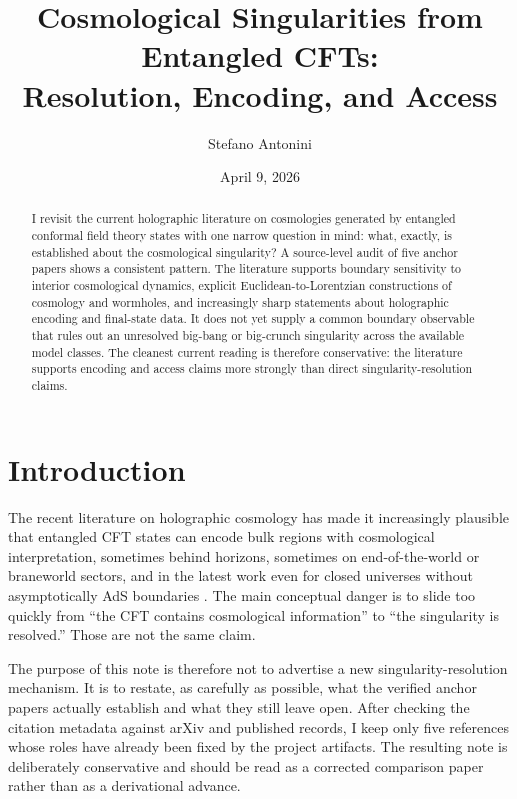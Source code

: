 \documentclass[11pt]{article}
\title{Cosmological Singularities from Entangled CFTs:\\
Resolution, Encoding, and Access}
\author{Stefano Antonini}
\date{April 9, 2026}
\begin{document}
\maketitle

\begin{abstract}
I revisit the current holographic literature on cosmologies generated by entangled conformal field theory states with one narrow question in mind: what, exactly, is established about the cosmological singularity? A source-level audit of five anchor papers shows a consistent pattern. The literature supports boundary sensitivity to interior cosmological dynamics, explicit Euclidean-to-Lorentzian constructions of cosmology and wormholes, and increasingly sharp statements about holographic encoding and final-state data. It does not yet supply a common boundary observable that rules out an unresolved big-bang or big-crunch singularity across the available model classes. The cleanest current reading is therefore conservative: the literature supports encoding and access claims more strongly than direct singularity-resolution claims.
\end{abstract}

\section{Introduction}

The recent literature on holographic cosmology has made it increasingly plausible that entangled CFT states can encode bulk regions with cosmological interpretation, sometimes behind horizons, sometimes on end-of-the-world or braneworld sectors, and in the latest work even for closed universes without asymptotically AdS boundaries \cite{Cooper:2018cmb,VanRaamsdonk:2021qgv,Antonini:2022ptt,Antonini:2024magnetic,Rath:2025baby}. The main conceptual danger is to slide too quickly from ``the CFT contains cosmological information'' to ``the singularity is resolved.'' Those are not the same claim.

The purpose of this note is therefore not to advertise a new singularity-resolution mechanism. It is to restate, as carefully as possible, what the verified anchor papers actually establish and what they still leave open. After checking the citation metadata against arXiv and published records, I keep only five references whose roles have already been fixed by the project artifacts. The resulting note is deliberately conservative and should be read as a corrected comparison paper rather than as a derivational advance.
\end{document}
